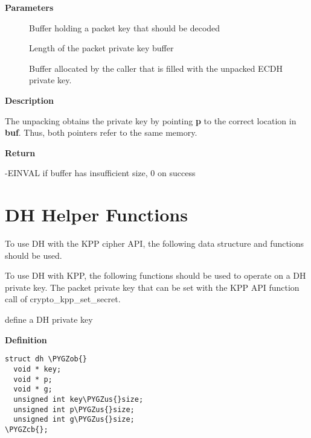 \documentclass[a4paper,8pt,english]{sphinxmanual}
\def\PYGZus{\char`\_}
\def\PYGZob{\char`\{}
\def\PYGZcb{\char`\}}
\begin{document}
\textbf{Parameters}
\begin{description}
\item[{}] \leavevmode
Buffer holding a packet key that should be decoded

\item[{}] \leavevmode
Length of the packet private key buffer

\item[{}] \leavevmode
Buffer allocated by the caller that is filled with the
unpacked ECDH private key.

\end{description}

\textbf{Description}

The unpacking obtains the private key by pointing \textbf{p} to the correct location
in \textbf{buf}. Thus, both pointers refer to the same memory.

\textbf{Return}

-EINVAL if buffer has insufficient size, 0 on success


\section{DH Helper Functions}
\label{crypto/api-kpp:dh-helper-functions}
To use DH with the KPP cipher API, the following data structure and
functions should be used.

To use DH with KPP, the following functions should be used to operate on
a DH private key. The packet private key that can be set with
the KPP API function call of crypto\_kpp\_set\_secret.

\begin{fulllineitems}
\label{crypto/api-kpp:c.dh}
define a DH private key

\end{fulllineitems}


\textbf{Definition}

\begin{Verbatim}[commandchars=\\\{\}]
struct dh \PYGZob{}
  void * key;
  void * p;
  void * g;
  unsigned int key\PYGZus{}size;
  unsigned int p\PYGZus{}size;
  unsigned int g\PYGZus{}size;
\PYGZcb{};
\end{Verbatim}
\end{document}

